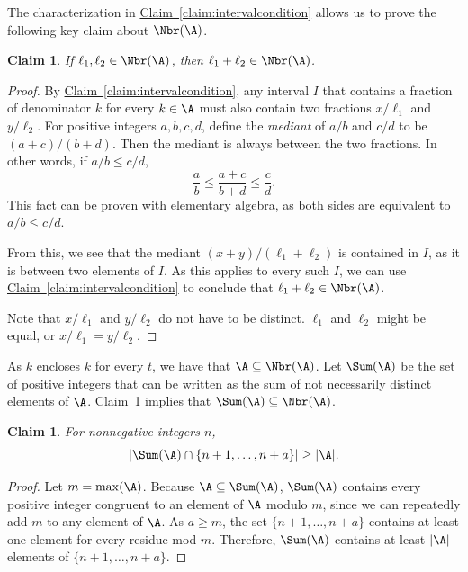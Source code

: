 \documentclass[11pt]{article}
\numberwithin{equation}{section}
\newtheorem{claim}[theorem]{Claim}
\theoremstyle{definition}
\theoremstyle{plain}
\newcommand{\expref}[2]{\hyperref[#2]{#1~\ref{#2}}}
\begin{document}
The characterization in \expref{Claim}{claim:intervalcondition} allows us to prove the following key claim about $\Nbr(\A)$.

\begin{claim}
    \label{claim:sumcondition}
    If $\ell_1,\ell_2\in \Nbr(\A)$, then $\ell_1+\ell_2\in \Nbr(\A)$.
\end{claim}

\begin{proof}
    By \expref{Claim}{claim:intervalcondition}, any interval $I$ that contains a fraction of denominator $k$ for every $k\in \A$ must also contain two fractions $x/\ell_1$ and $y/\ell_2$. For positive integers $a,b,c,d$, define the \emph{mediant} of $a/b$ and $c/d$ to be $(a+c)/(b+d)$. Then the mediant is always between the two fractions. In other words, if $a/b\le c/d$,
    \[\frac{a}{b}\le \frac{a+c}{b+d}\le \frac{c}{d}. \]
    This fact can be proven with elementary algebra, as both sides are equivalent to $a/b\le c/d$.
    
    From this, we see that the mediant $(x+y)/(\ell_1+\ell_2)$ is contained in $I$, as it is between two elements of $I$. As this applies to every such $I$, we can use \expref{Claim}{claim:intervalcondition} to conclude that $\ell_1+\ell_2\in \Nbr(\A)$.
    
    Note that $x/\ell_1$ and $y/\ell_2$ do not have to be distinct. $\ell_1$ and $\ell_2$ might be equal, or $x/\ell_1=y/\ell_2$.
\end{proof}

As $k$ encloses $k$ for every $t$, we have that $\A\subseteq \Nbr(\A)$. Let $\Sum(\A)$ be the set of positive integers that can be written as the sum of not necessarily distinct elements of $\A$. \expref{Claim}{claim:sumcondition} implies that $\Sum(\A)\subseteq \Nbr(\A)$.

\begin{claim}
    For nonnegative integers $n$, \[\lvert\Sum(\A)\cap \{n+1,\dots,n+a\}\rvert\ge |\A|.\]
\end{claim}

\begin{proof}
    Let $m=\max(\A)$. Because $\A\subseteq \Sum(\A)$, $\Sum(\A)$ contains every positive integer congruent to an element of $\A$ modulo $m$, since we can repeatedly add $m$ to any element of $\A$. As $a\ge m$, the set $\{n+1,\dots,n+a\}$ contains at least one element for every residue mod $m$. Therefore, $\Sum(\A)$ contains at least $|\A|$ elements of $\{n+1,\dots,n+a\}$. 
\end{proof}
\end{document}
